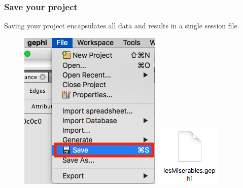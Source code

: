 \documentclass[10pt]{beamer}
\begin{document}
\begin{frame}
\frametitle{Save your project}
Saving your project encapsulates all data and results in a single session file.
\begin{figure}
\centering
\begin{minipage}{.45\textwidth}
\centering
\includegraphics[width=0.8\linewidth]{figures/save.png}
\end{minipage}
\begin{minipage}{.45\textwidth}
\centering
\includegraphics[width=0.8\linewidth]{figures/saved_file.png}
\end{minipage}
\end{figure}
\end{frame}
\end{document}
